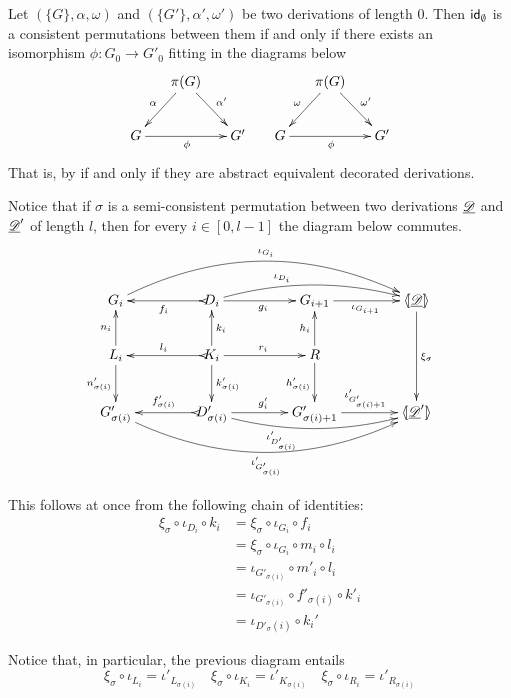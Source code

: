 \begin{example}\label{rem:empty2}
	Let $(\{G\}, \alpha, \omega)$ and $(\{G'\}, \alpha', \omega')$ be two derivations of length $0$. Then $\mathsf{id}_{\emptyset}$ is a consistent permutations between them if and only if there exists an isomorphism $\phi\colon G_0\to G'_0$ fitting in the diagrams below
	\[\xymatrix@C=15pt{&\pi(G) \ar[dr]^{\alpha'} \ar[dl]_{\alpha}&&& \pi(G) \ar[dr]^{\omega'} \ar[dl]_{\omega}\\ G\ar[rr]_{\phi} && G' &G \ar[rr]_{\phi} && G' } \]
	That is, by  if and only if they are abstract equivalent decorated derivations.
\end{example}

\begin{remark} Notice that if $\sigma$ is a semi-consistent permutation between two derivations  $\underline{\mathscr{D}}$ and $\underline{\mathscr{D}}'$ of length $l$, then for every  $i\in [0,l-1]$ the diagram below commutes.
	\[\xymatrix@C=40pt{G_i\ar@/^1cm/[rrr]^{\iota_{G_{i}}}&D_i\ar@/^.4cm/[rr]^(.35){\iota_{D_i}} \ar[r]_{g_i} \ar@{>->}[l]^{f_i}&G_{i+1} \ar[r]_{\iota_{G_{i+1}}}&\tpro{D} \ar[dd]^{\xi_\sigma}\\  L_i \ar[u]^{n_i} \ar[d]_{n'_{\sigma(i)}}& K_i \ar[d]^{k'_{\sigma(i)}} \ar[u]_{k_i} \ar[r]^{r_i} \ar@{>->}[l]_{l_i} &R\ar[u]^{h_i} \ar[d]_{h'_{\sigma(i)}}\\G'_{\sigma(i)}\ar@/_1cm/[rrr]_{\iota'_{G'_{\sigma(i)}}} &D'_{\sigma(i)}\ar@{>->}[l]_{f'_{\sigma(i)}} \ar[r]^{g'_i} \ar@/_.4cm/[rr]_(.35){\iota'_{D'_{\sigma(i)}}}&G'_{\sigma(i)+1} \ar[r]^{\iota'_{G'_{\sigma(i)+1}}}& \lpro\der{D}' \rpro }\]
	
	This follows at once from the following chain of identities:
	\begin{align*}
		\xi_\sigma \circ \iota_{D_i}\circ k_i&=\xi_\sigma \circ \iota_{G_{i}} \circ f_i\\&= \xi_\sigma \circ \iota_{G_{i}}\circ m_i \circ l_i\\&=\iota_{G'_{\sigma(i)}}\circ m'_i\circ l_i\\&=\iota_{G'_{\sigma(i)}}\circ f'_{\sigma(i)}\circ k'_i\\&=\iota_{D'_\sigma(i)}\circ k_i'
	\end{align*}
\end{remark}

\begin{remark}\label{rem:coproj}
	Notice that, in particular, the previous diagram entails
	\[\xi_\sigma \circ \iota_{L_i}=\iota'_{L_{\sigma(i)}} \quad \xi_\sigma \circ \iota_{K_i}=\iota'_{K_{\sigma(i)}} \quad \xi_\sigma \circ \iota_{R_i}=\iota'_{R_{\sigma(i)}} \]
\end{remark}

